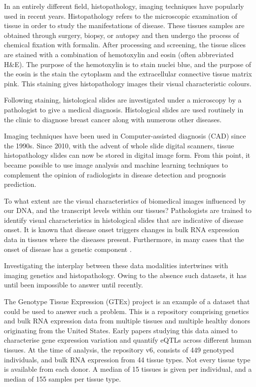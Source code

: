 \documentclass[graybox]{svmult}
\begin{document}
In an entirely different field, histopathology, imaging techniques have popularly used in recent years. Histopathology refers to the microscopic examination of tissue in order to study the manifestations of disease. These tissues samples are obtained through surgery, biopsy, or autopsy and then undergo the process of chemical fixation with formalin. After processing and screening, the tissue slices are stained with a combination of hemotoxylin and eosin \cite{hematoxylin-and-eosin-staining} (often abbreviated H\&E). The purpose of the hemotoxylin is to stain nuclei blue, and the purpose of the eosin is the stain the cytoplasm and the extracellular connective tissue matrix pink. This staining gives histopathology images their visual characteristic colours.

Following staining, histological slides are investigated under a microscopy by a pathologist to give a medical diagnosis. Histological slides are used routinely in the clinic to diagnose breast cancer along with numerous other diseases.

Imaging techniques have been used in Computer-assisted diagnosis (CAD) \cite{histopathological-image-analysis} since the 1990s. Since 2010, with the advent of whole slide digital scanners, tissue histopathology slides can now be stored in digital image form. From this point, it became possible to use image analysis and machine learning techniques to complement the opinion of radiologists in disease detection and prognosis prediction.

To what extent are the visual characteristics of biomedical images influenced by our DNA, and the transcript levels within our tissues? Pathologists are trained to identify visual characteristics in histological slides that are indicative of disease onset. It is known that disease onset triggers changes in bulk RNA expression data in tissues where the diseases present. \cite{gene-expression-parkinsons} Furthermore, in many cases that the onset of disease has a genetic component \cite{what-is-complex-about-complex-disorders}. 

Investigating the interplay between these data modalities intertwines with imaging genetics and histopathology. Owing to the absence such datasets, it has until been impossible to answer until recently.

The Genotype Tissue Expression (GTEx) project \cite{GTEx-project} is an example of a dataset that could be used to answer such a problem. This is a repository comprising genetics and bulk RNA expression data from multiple tissues and multiple healthy donors originating from the United States. Early papers studying this data aimed to characterise gene expression variation and quantify eQTLs across different human tissues. At the time of analysis, the repository v6, consists of 449 genotyped individuals, and bulk RNA expression from 44 tissue types. Not every tissue type is available from each donor. A median of 15 tissues is given per individual, and a median of 155 samples per tissue type.
\end{document}
